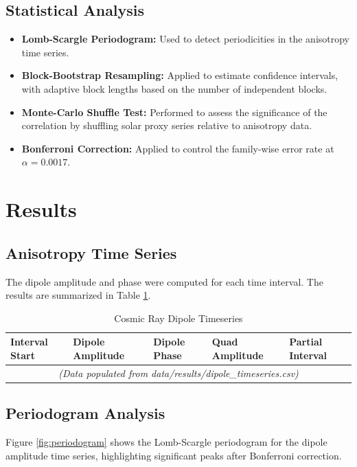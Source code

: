 \documentclass[11pt,a4paper]{article}
\begin{document}
\subsection{Statistical Analysis}
\begin{itemize}
 \item \textbf{Lomb-Scargle Periodogram:} Used to detect periodicities in the anisotropy time series.
 \item \textbf{Block-Bootstrap Resampling:} Applied to estimate confidence intervals, with adaptive block lengths based on the number of independent blocks.
 \item \textbf{Monte-Carlo Shuffle Test:} Performed to assess the significance of the correlation by shuffling solar proxy series relative to anisotropy data.
 \item \textbf{Bonferroni Correction:} Applied to control the family-wise error rate at $\alpha=0.0017$.
\end{itemize}

\section{Results}
\subsection{Anisotropy Time Series}
The dipole amplitude and phase were computed for each time interval. The results are summarized in Table \ref{tab:dipole_timeseries}.

\begin{table}[H]
\centering
\caption{Cosmic Ray Dipole Timeseries}
\label{tab:dipole_timeseries}
\begin{tabular}{lllll}
\toprule
Interval Start & Dipole Amplitude & Dipole Phase & Quad Amplitude & Partial Interval \\
\midrule
\multicolumn{5}{c}{\textit{(Data populated from data/results/dipole_timeseries.csv)}} \\
\bottomrule
\end{tabular}
\end{table}

\subsection{Periodogram Analysis}
Figure \ref{fig:periodogram} shows the Lomb-Scargle periodogram for the dipole amplitude time series, highlighting significant peaks after Bonferroni correction.
\end{document}

